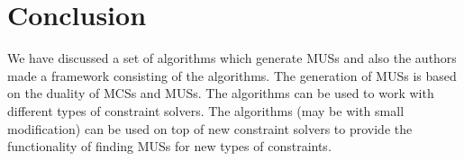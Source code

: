 \section{Conclusion}
\label{sec:conclusion}
We have discussed a set of algorithms which generate MUSs and also the authors made a framework consisting of the algorithms. The generation of MUSs is based on the duality of MCSs and MUSs. The algorithms can be used to work with different types of constraint solvers. The algorithms (may be with small modification) can be used on top of new constraint solvers to provide the functionality of finding MUSs for new types of constraints.